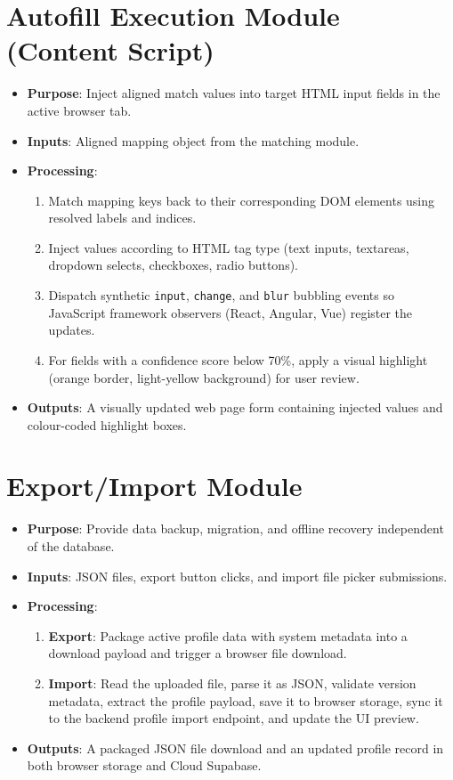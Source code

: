 \documentclass[12pt,a4paper]{report}
\begin{document}
\section{Autofill Execution Module (Content Script)}
\begin{itemize}
    \item \textbf{Purpose}: Inject aligned match values into target HTML input fields in the active browser tab.
    \item \textbf{Inputs}: Aligned mapping object from the matching module.
    \item \textbf{Processing}: 
    \begin{enumerate}
        \item Match mapping keys back to their corresponding DOM elements using resolved labels and indices.
        \item Inject values according to HTML tag type (text inputs, textareas, dropdown selects, checkboxes, radio buttons).
        \item Dispatch synthetic \texttt{input}, \texttt{change}, and \texttt{blur} bubbling events so JavaScript framework observers (React, Angular, Vue) register the updates.
        \item For fields with a confidence score below 70\%, apply a visual highlight (orange border, light-yellow background) for user review.
    \end{enumerate}
    \item \textbf{Outputs}: A visually updated web page form containing injected values and colour-coded highlight boxes.
\end{itemize}

\section{Export/Import Module}
\begin{itemize}
    \item \textbf{Purpose}: Provide data backup, migration, and offline recovery independent of the database.
    \item \textbf{Inputs}: JSON files, export button clicks, and import file picker submissions.
    \item \textbf{Processing}: 
    \begin{enumerate}
        \item \textbf{Export}: Package active profile data with system metadata into a download payload and trigger a browser file download.
        \item \textbf{Import}: Read the uploaded file, parse it as JSON, validate version metadata, extract the profile payload, save it to browser storage, sync it to the backend profile import endpoint, and update the UI preview.
    \end{enumerate}
    \item \textbf{Outputs}: A packaged JSON file download and an updated profile record in both browser storage and Cloud Supabase.
\end{itemize}
\end{document}
